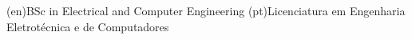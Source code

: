 %
%
%



%
%
%
\ntauthordegree(en){BSc in Electrical and Computer Engineering}
\ntauthordegree(pt){Licenciatura em Engenharia Eletrotécnica e de Computadores}



%
%
%



